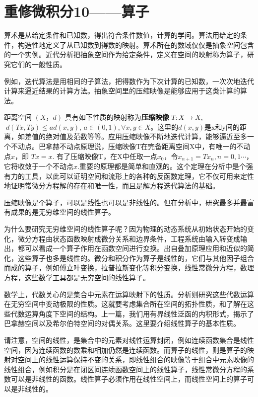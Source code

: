 \chapter{重修微积分10——算子}

算术是从给定条件和已知数，得出符合条件数值，计算的学问。算法用给定的条件，构造性地定义了从已知数到得数的映射。算术所在的数域仅仅是抽象空间包含的一个实例。近代分析把抽象空间作为给定条件，定义在空间的映射称为算子，研究它们的一般性质。

例如，迭代算法是用相同的子算法，把得数作为下次计算的已知数，一次次地迭代计算来逼近结果的计算方法。抽象空间里的压缩映像是能够应用于这类计算的算法。

距离空间 $ (X，d) $ 具有如下性质的映射称为\textbf{压缩映像} $ T: X \rightarrow X, \;$  $\; d(Tx, Ty)\leq ad(x,y) $,  $ a\in(0,1),\forall x,y \in X $。这里的$ d(x,y) $是x和y间的距离，如差值的绝对值及范数等等。应用压缩映像不断地迭代计算，能够逼近至多一个不动点。巴拿赫不动点原理说，压缩映像T在完备距离空间X中，有唯一的不动点$ x $，即 $  Tx = x $. 有了压缩映像T，在X中任取一点$ x_0 $，令$ x_{n+1} =Tx_n, n=0,1\cdots $，它将收敛于一个不动点$ x $.重要的原理都是简单和直观的。这个定理在分析中是个强有力的工具，以此可以证明空间和流形上的各种的反函数定理，它不仅可用来定性地证明常微分方程解的存在和唯一性，而且是解方程迭代算法的基础。

压缩映像是个算子，可以是线性也可以是非线性的。但在分析中，研究最多并最富有成果的是无穷维空间的线性算子。

为什么要研究无穷维空间的线性算子呢？因为物理的动态系统从初始状态开始的变化，微分方程由状态函数映射成微分关系和边界条件，工程系统由输入转变成输出，都可以看成一个算子作用在函数空间进行变换。出自叠加原理应用和近似的简化，这些算子也多是线性的。微分和积分作为算子是线性的，它们与其他因子组合而成的算子，例如傅立叶变换，拉普拉斯变化等积分变换，线性常微分方程，数理方程，这些数学工具都是无穷空间的线性算子。

数学上，代数关心的是集合中元素在运算映射下的性质。分析则研究这些代数运算在无穷空间中变动极限的性质。这就要考虑集合所在空间的拓扑性质，和了解在这些代数运算角度下空间的结构。上一篇，我们用有界线性泛函的内积形式，揭示了巴拿赫空间以及希尔伯特空间的对偶关系。这里要介绍线性算子的基本性质。

请注意，空间的线性，是集合中的元素对线性运算封闭，例如连续函数集合是线性空间，因为连续函数的数乘和相加仍然是连续函数。而算子的线性，则是算子的映射对空间上的线性运算保持不变的关系，即线性组合的映像等于组合中元素映像的线性组合，例如积分是在闭区间连续函数空间上的线性算子，线性常微分方程的系数可以是非线性的函数。线性算子必须作用在线性空间上，而线性空间上的算子可以是非线性的。

